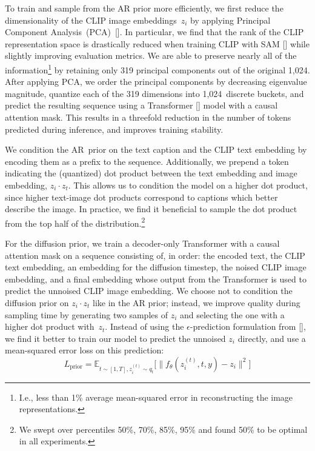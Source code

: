 To train and sample from the AR prior more efficiently, we first reduce the dimensionality of the CLIP image embeddings~$z_i$ by applying Principal Component Analysis~(PCA)~[]. In particular, we find that the rank of the CLIP representation space is drastically reduced when training CLIP with SAM [] while slightly improving evaluation metrics. We are able to preserve nearly all of the information\footnote{I.e., less than 1\% average mean-squared error in reconstructing the image representations.} by retaining only 319 principal components out of the original 1,024. After applying PCA, we order the principal components by decreasing eigenvalue magnitude, quantize each of the 319 dimensions into 1,024~discrete buckets, and predict the resulting sequence using a Transformer [] model with a causal attention mask. This results in a threefold reduction in the number of tokens predicted during inference, and improves training stability.

We condition the AR~prior on the text caption and the CLIP text embedding by encoding them as a prefix to the sequence. Additionally, we prepend a token indicating the (quantized) dot product between the text embedding and image embedding, $z_i \cdot z_t$. This allows us to condition the model on a higher dot product, since higher text-image dot products correspond to captions which better describe the image. In practice, we find it beneficial to sample the dot product from the top half of the distribution.\footnote{We swept over percentiles 50\%, 70\%, 85\%, 95\% and found 50\% to be optimal in all experiments.} 

For the diffusion prior, we train a decoder-only Transformer with a causal attention mask on a sequence consisting of, in order: the encoded text, the CLIP text embedding, an embedding for the diffusion timestep, the noised CLIP image embedding, and a final embedding whose output from the Transformer is used to predict the unnoised CLIP image embedding. We choose not to condition the diffusion prior on $z_i \cdot z_t$ like in the AR prior; instead, we improve quality during sampling time by generating two samples of $z_i$ and selecting the one with a higher dot product with~$z_t$. Instead of using the $\epsilon$-prediction formulation from \citeauthor{ddpm} [], we find it better to train our model to predict the unnoised $z_i$ directly, and use a mean-squared error loss on this prediction:
$$L_{\text{prior}} = \mathbb{E}_{t \sim [1,T], z_i^{(t)} \sim q_t} \big[\|f_{\theta}(z_i^{(t)}, t, y) - z_i\|^2\big]$$

